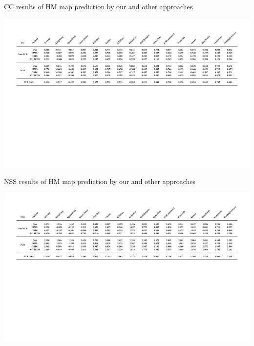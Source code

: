 \documentclass[10pt,journal,compsoc]{IEEEtran}
\begin{document}
%
\begin{table}
	\begin{center}
        \caption{CC results of HM map prediction by our and other approaches}
        \label{table-result}
    		\centerline{\includegraphics[width=2\columnwidth]{figures/experiment/cc_0731_2}}%
	\end{center}
\end{table}

\begin{table}
	\begin{center}
    \caption{NSS results of HM map prediction by our and other approaches}
    \label{NSS}
		\centerline{\includegraphics[width=2\columnwidth]{figures/experiment/nss_0731_1}}%
	\end{center}
\end{table}
\end{document}
